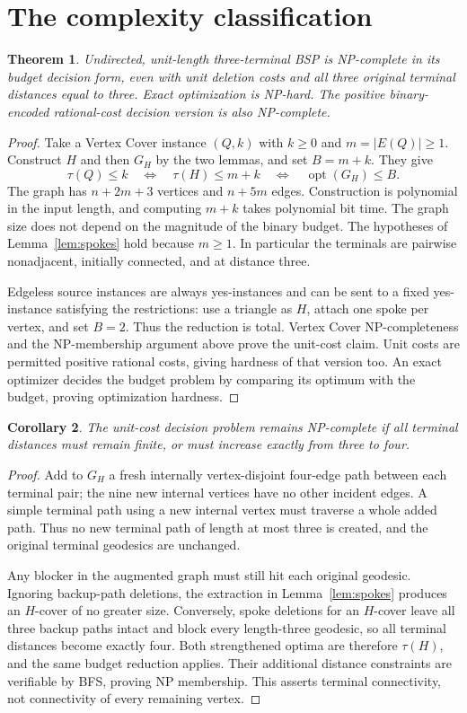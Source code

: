 \documentclass[11pt]{article}
\newtheorem{theorem}{Theorem}
\newtheorem{corollary}[theorem]{Corollary}
\newcommand{\opt}{\operatorname{opt}}
\begin{document}
\section{The complexity classification}
\begin{theorem}\label{thm:main}
Undirected, unit-length three-terminal BSP is NP-complete in its budget decision
form, even with unit deletion costs and all three original terminal distances
equal to three. Exact optimization is NP-hard. The positive binary-encoded
rational-cost decision version is also NP-complete.
\end{theorem}
\begin{proof}
Take a Vertex Cover instance $(Q,k)$ with $k\ge0$ and $m=|E(Q)|\ge1$.
Construct $H$ and then $G_H$ by the two lemmas, and set $B=m+k$. They give
\[
\tau(Q)\le k\quad\Longleftrightarrow\quad
\tau(H)\le m+k\quad\Longleftrightarrow\quad\opt(G_H)\le B.
\]
The graph has $n+2m+3$ vertices and $n+5m$ edges. Construction is polynomial
in the input length, and computing $m+k$ takes polynomial bit time. The graph
size does not depend on the magnitude of the binary budget. The hypotheses of
Lemma~\ref{lem:spokes} hold because $m\ge1$. In particular the terminals are
pairwise nonadjacent, initially connected, and at distance three.

Edgeless source instances are always yes-instances and can be sent to a fixed
yes-instance satisfying the restrictions: use a triangle as $H$, attach one
spoke per vertex, and set $B=2$. Thus the reduction is total. Vertex Cover
NP-completeness and the NP-membership argument above prove the unit-cost
claim. Unit costs are permitted positive rational costs, giving hardness of
that version too. An exact optimizer decides the budget problem by comparing
its optimum with the budget, proving optimization hardness.
\end{proof}

\begin{corollary}\label{cor:finite}
The unit-cost decision problem remains NP-complete if all terminal distances
must remain finite, or must increase exactly from three to four.
\end{corollary}
\begin{proof}
Add to $G_H$ a fresh internally vertex-disjoint four-edge path between each
terminal pair; the nine new internal vertices have no other incident edges.
A simple terminal path using a new internal vertex must traverse a whole
added path. Thus no new terminal path of length at most three is created,
and the original terminal geodesics are unchanged.

Any blocker in the augmented graph must still hit each original geodesic.
Ignoring backup-path deletions, the extraction in Lemma~\ref{lem:spokes}
produces an $H$-cover of no greater size. Conversely, spoke deletions for an
$H$-cover leave all three backup paths intact and block every length-three
geodesic, so all terminal distances become exactly four. Both strengthened
optima are therefore $\tau(H)$, and the same budget reduction applies.
Their additional distance constraints are verifiable by BFS, proving NP
membership. This asserts terminal connectivity, not connectivity of every
remaining vertex.
\end{proof}
\end{document}
